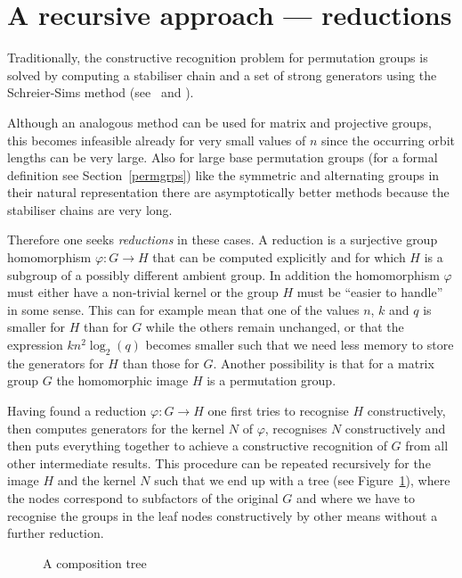 \section{A recursive approach --- reductions}
\label{recapproach}
%

Traditionally, the constructive recognition problem for permutation
groups is solved by computing a stabiliser chain and a set of strong
generators using the Schreier-Sims method (see~\cite{Si} and \cite{Ser}). 

Although an analogous method can be used for matrix and projective groups,
this becomes infeasible already for very small values of $n$ since the
occurring orbit lengths can be very large. Also for large base permutation
groups (for a formal definition see Section~\ref{permgrps}) like the
symmetric and alternating groups in their natural representation there
are asymptotically better methods because the stabiliser chains are very long.

Therefore one seeks \emph{reductions} in these cases. A reduction is
a surjective group homomorphism $\varphi : G \to H$ that can be computed
explicitly and for which $H$ is a subgroup of a possibly different
ambient group. In addition the homomorphism $\varphi$ must either have
a non-trivial kernel or the group $H$ must be ``easier to handle'' in some
sense. This can for example mean that one of the values $n$, $k$ and
$q$ is smaller for $H$ than for $G$ while the others remain unchanged,
or that the expression $kn^2\log_2(q)$ becomes smaller such that we need
less memory to store the generators for $H$ than those for $G$.
Another possibility is that for a matrix group $G$ the homomorphic image
$H$ is a permutation group.

%
Having found a reduction $\varphi : G \to H$ one first tries to recognise
$H$ constructively, then computes generators for the kernel $N$ of
$\varphi$, recognises $N$ constructively and then puts everything together
to achieve a constructive recognition of $G$ from all other intermediate
results. This procedure can be repeated recursively for the image $H$ and
the kernel $N$ such that we end up with a tree (see
Figure~\ref{comptreefig}), where the nodes correspond
to subfactors of the original $G$ and where we have to recognise
the groups in the leaf nodes constructively by other means without
a further reduction.
%

\begin{figure}
\caption{A composition tree}
\label{comptreefig}
%
\begin{center}
%
%
\end{center}
\end{figure}

